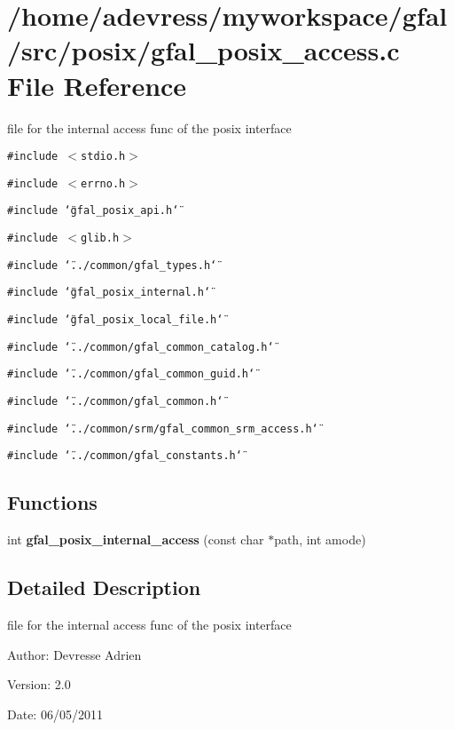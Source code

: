 \section{/home/adevress/myworkspace/gfal/src/posix/gfal\_\-posix\_\-access.c File Reference}
\label{gfal__posix__access_8c}
file for the internal access func of the posix interface 

{\tt \#include $<$stdio.h$>$}\par
{\tt \#include $<$errno.h$>$}\par
{\tt \#include \char`\"{}gfal\_\-posix\_\-api.h\char`\"{}}\par
{\tt \#include $<$glib.h$>$}\par
{\tt \#include \char`\"{}../common/gfal\_\-types.h\char`\"{}}\par
{\tt \#include \char`\"{}gfal\_\-posix\_\-internal.h\char`\"{}}\par
{\tt \#include \char`\"{}gfal\_\-posix\_\-local\_\-file.h\char`\"{}}\par
{\tt \#include \char`\"{}../common/gfal\_\-common\_\-catalog.h\char`\"{}}\par
{\tt \#include \char`\"{}../common/gfal\_\-common\_\-guid.h\char`\"{}}\par
{\tt \#include \char`\"{}../common/gfal\_\-common.h\char`\"{}}\par
{\tt \#include \char`\"{}../common/srm/gfal\_\-common\_\-srm\_\-access.h\char`\"{}}\par
{\tt \#include \char`\"{}../common/gfal\_\-constants.h\char`\"{}}\par
\subsection*{Functions}
\begin{CompactItemize}
\item 
int \textbf{gfal\_\-posix\_\-internal\_\-access} (const char $\ast$path, int amode)\label{gfal__posix__access_8c_4dd88ccfb2942d117604793819e1f933}

\end{CompactItemize}


\subsection{Detailed Description}
file for the internal access func of the posix interface 

\begin{Desc}
\item[Author:]Devresse Adrien \end{Desc}
\begin{Desc}
\item[Version:]2.0 \end{Desc}
\begin{Desc}
\item[Date:]06/05/2011 \end{Desc}
